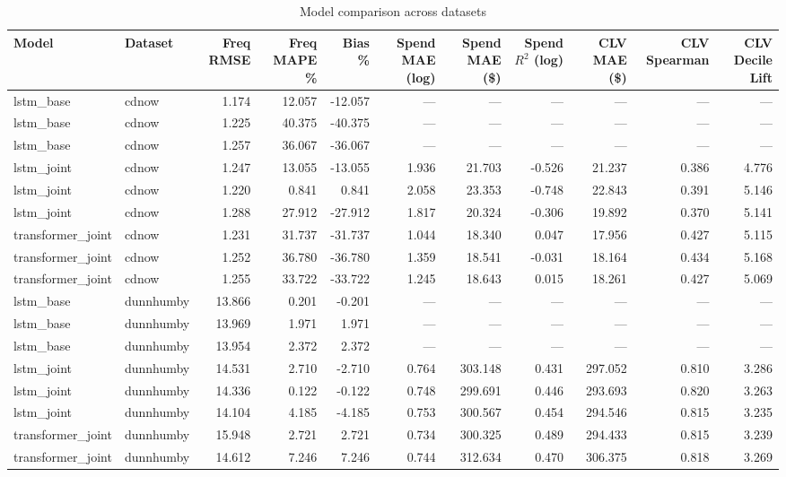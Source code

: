 \begin{table}
\caption{Model comparison across datasets}
\label{tab:model_comparison}
\begin{tabular}{llrrrrrrrrr}
\toprule
Model & Dataset & Freq RMSE & Freq MAPE \% & Bias \% & Spend MAE (log) & Spend MAE (\$) & Spend $R^2$ (log) & CLV MAE (\$) & CLV Spearman & CLV Decile Lift \\
\midrule
lstm_base & cdnow & 1.174 & 12.057 & -12.057 & — & — & — & — & — & — \\
lstm_base & cdnow & 1.225 & 40.375 & -40.375 & — & — & — & — & — & — \\
lstm_base & cdnow & 1.257 & 36.067 & -36.067 & — & — & — & — & — & — \\
lstm_joint & cdnow & 1.247 & 13.055 & -13.055 & 1.936 & 21.703 & -0.526 & 21.237 & 0.386 & 4.776 \\
lstm_joint & cdnow & 1.220 & 0.841 & 0.841 & 2.058 & 23.353 & -0.748 & 22.843 & 0.391 & 5.146 \\
lstm_joint & cdnow & 1.288 & 27.912 & -27.912 & 1.817 & 20.324 & -0.306 & 19.892 & 0.370 & 5.141 \\
transformer_joint & cdnow & 1.231 & 31.737 & -31.737 & 1.044 & 18.340 & 0.047 & 17.956 & 0.427 & 5.115 \\
transformer_joint & cdnow & 1.252 & 36.780 & -36.780 & 1.359 & 18.541 & -0.031 & 18.164 & 0.434 & 5.168 \\
transformer_joint & cdnow & 1.255 & 33.722 & -33.722 & 1.245 & 18.643 & 0.015 & 18.261 & 0.427 & 5.069 \\
lstm_base & dunnhumby & 13.866 & 0.201 & -0.201 & — & — & — & — & — & — \\
lstm_base & dunnhumby & 13.969 & 1.971 & 1.971 & — & — & — & — & — & — \\
lstm_base & dunnhumby & 13.954 & 2.372 & 2.372 & — & — & — & — & — & — \\
lstm_joint & dunnhumby & 14.531 & 2.710 & -2.710 & 0.764 & 303.148 & 0.431 & 297.052 & 0.810 & 3.286 \\
lstm_joint & dunnhumby & 14.336 & 0.122 & -0.122 & 0.748 & 299.691 & 0.446 & 293.693 & 0.820 & 3.263 \\
lstm_joint & dunnhumby & 14.104 & 4.185 & -4.185 & 0.753 & 300.567 & 0.454 & 294.546 & 0.815 & 3.235 \\
transformer_joint & dunnhumby & 15.948 & 2.721 & 2.721 & 0.734 & 300.325 & 0.489 & 294.433 & 0.815 & 3.239 \\
transformer_joint & dunnhumby & 14.612 & 7.246 & 7.246 & 0.744 & 312.634 & 0.470 & 306.375 & 0.818 & 3.269 \\

\end{tabular}
\end{table}
